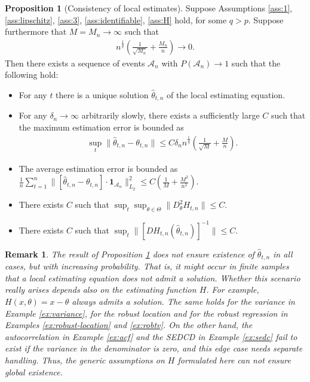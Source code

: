 \documentclass[10pt, a4paper]{article}
\theoremstyle{assumption}
\newtheorem{remark}{Remark}[section]
\theoremstyle{definition}
\theoremstyle{theorem}
\newtheorem{proposition}{Proposition}
\begin{document}
\begin{shaded}
\begin{proposition}[Consistency of local estimates]\label{prop:pilot}
    Suppose Assumptions \ref{ass:1}, \ref{ass:lipschitz}, \ref{ass:3}, \ref{ass:identifiable}, \ref{ass:H} hold, for some $q>p$. 
    Suppose furthermore that $M=M_n\to\infty$ such that
    \begin{align}
        n^{\frac{1}{q}} \left(\tfrac{1}{\sqrt{M_n}} + \tfrac{M_n}{n}\right)\longrightarrow 0. \label{eq:M-rate}
    \end{align}
    Then there exists a sequence of events $\mathcal{A}_n$ with $P(\mathcal{A}_n)\to 1$ such that the following hold:
    \begin{itemize}
        \item[(i)] For any $t$ there is a unique solution $\widehat{\theta}_{t,n}$ of the local estimating equation.
        \item[(ii)] For any $\delta_n\to \infty$ arbitrarily slowly, there exists a sufficiently large $C$ such that the maximum estimation error is bounded as
        \begin{align*}
            \sup_t \|\widehat{\theta}_{t,n}-\theta_{t,n}\| \leq C \delta_n n^{\frac{1}{q}}\left(\tfrac{1}{\sqrt{M}} + \tfrac{M}{n}\right).
        \end{align*}
        \item[(iii)] The average estimation error is bounded as $\frac{1}{n}\sum_{t=1}^n \|[\widehat{\theta}_{t,n}-\theta_{t,n}] \cdot \mathbf{1}_{\mathcal{A}_n}\|_{L_2}^2 \leq C (\frac{1}{M}+\frac{M^2}{n^2})$.
        \item[(iv)] There exists $C$ such that $\sup_t\sup_{\theta\in\Theta} \|D^2_\theta H_{t,n}\| \leq C$.
        \item[(v)] There exists $C$ such that $\sup_t\|[DH_{t,n}(\widehat{\theta}_{t,n})]^{-1}\| \leq C$.
    \end{itemize}
\end{proposition}
\end{shaded}
\begin{remark}
    The result of Proposition \ref{prop:pilot} does not ensure existence of $\widehat{\theta}_{t,n}$ in all cases, but with increasing probability. 
    That is, it might occur in finite samples that a local estimating equation does not admit a solution. 
    Whether this scenario really arises depends also on the estimating function $H$. 
    For example, $H(x,\theta)=x-\theta$ always admits a solution. 
    The same holds for the variance in Example \ref{ex:variance}, for the robust location and for the robust regression in Examples \ref{ex:robust-location} and \ref{ex:robtv}.
    On the other hand, the autocorrelation in Example \ref{ex:acf} and the SEDCD in Example \ref{ex:sedc} fail to exist if the variance in the denominator is zero, and this edge case needs separate handling.
    Thus, the generic assumptions on $H$ formulated here can not ensure global existence.
\end{remark}
\end{document}
